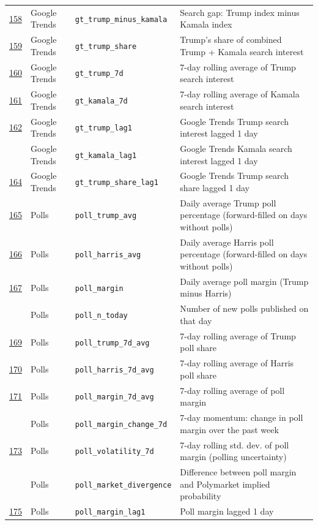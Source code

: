 \begin{longtable}{>{\centering\arraybackslash}p{0.9cm} p{2cm} p{4cm} p{7.5cm}}
\underline{158} & Google Trends & \texttt{gt\_trump\_minus\_kamala} & Search gap: Trump index minus Kamala index \\
\underline{159} & Google Trends & \texttt{gt\_trump\_share} & Trump's share of combined Trump + Kamala search interest \\
\underline{160} & Google Trends & \texttt{gt\_trump\_7d} & 7-day rolling average of Trump search interest \\
\underline{161} & Google Trends & \texttt{gt\_kamala\_7d} & 7-day rolling average of Kamala search interest \\
\underline{162} & Google Trends & \texttt{gt\_trump\_lag1} & Google Trends Trump search interest lagged 1 day \\
163 & Google Trends & \texttt{gt\_kamala\_lag1} & Google Trends Kamala search interest lagged 1 day \\
\underline{164} & Google Trends & \texttt{gt\_trump\_share\_lag1} & Google Trends Trump search share lagged 1 day \\
\underline{165} & Polls & \texttt{poll\_trump\_avg} & Daily average Trump poll percentage (forward-filled on days without polls) \\
\underline{166} & Polls & \texttt{poll\_harris\_avg} & Daily average Harris poll percentage (forward-filled on days without polls) \\
\underline{167} & Polls & \texttt{poll\_margin} & Daily average poll margin (Trump minus Harris) \\
168 & Polls & \texttt{poll\_n\_today} & Number of new polls published on that day \\
\underline{169} & Polls & \texttt{poll\_trump\_7d\_avg} & 7-day rolling average of Trump poll share \\
\underline{170} & Polls & \texttt{poll\_harris\_7d\_avg} & 7-day rolling average of Harris poll share \\
\underline{171} & Polls & \texttt{poll\_margin\_7d\_avg} & 7-day rolling average of poll margin \\
172 & Polls & \texttt{poll\_margin\_change\_7d} & 7-day momentum: change in poll margin over the past week \\
\underline{173} & Polls & \texttt{poll\_volatility\_7d} & 7-day rolling std. dev. of poll margin (polling uncertainty) \\
174 & Polls & \texttt{poll\_market\_divergence} & Difference between poll margin and Polymarket implied probability \\
\underline{175} & Polls & \texttt{poll\_margin\_lag1} & Poll margin lagged 1 day \\

\end{longtable}
